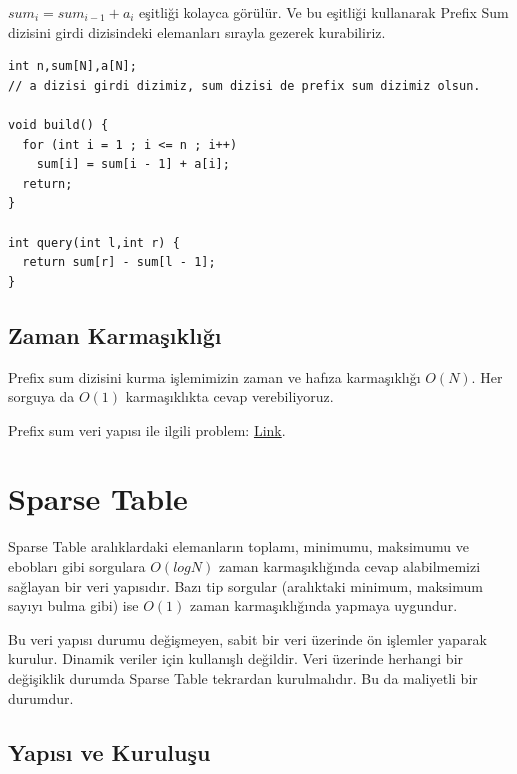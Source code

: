 \documentclass[12pt]{article}
\begin{document}
    $sum_i = sum_{i -1} + a_i$ e\c{s}itli\u{g}i kolayca g\"{o}r\"{u}l\"{u}r. Ve bu e\c{s}itli\u{g}i kullanarak Prefix Sum dizisini girdi dizisindeki elemanlar{\i} s{\i}rayla gezerek kurabiliriz.
	
    \begin{verbatim}
int n,sum[N],a[N];
// a dizisi girdi dizimiz, sum dizisi de prefix sum dizimiz olsun.

void build() {
  for (int i = 1 ; i <= n ; i++)
    sum[i] = sum[i - 1] + a[i];
  return;
}

int query(int l,int r) {
  return sum[r] - sum[l - 1];
}
    \end{verbatim}

	\subsection{Zaman Karma\c{s}{\i}kl{\i}\u{g}{\i}}
	
    Prefix sum dizisini kurma i\c{s}lemimizin zaman ve haf{\i}za karma\c{s}{\i}kl{\i}\u{g}{\i} $O(N)$. Her sorguya da $O(1)$ karma\c{s}{\i}kl{\i}kta cevap verebiliyoruz. 

    Prefix sum veri yap{\i}s{\i} ile ilgili problem: \href{https://uva.onlinejudge.org/index.php?option=com_onlinejudge&Itemid=8&category=24&page=show_problem&problem=1474}{Link}.
    \cleardoublepage

	\section{Sparse Table}

    Sparse Table aral{\i}klardaki elemanlar{\i}n toplam{\i}, minimumu, maksimumu ve eboblar{\i} gibi sorgulara $O(logN)$ zaman karma\c{s}{\i}kl{\i}\u{g}{\i}nda cevap alabilmemizi sa\u{g}layan bir veri yap{\i}s{\i}d{\i}r. Baz{\i} tip sorgular (aral{\i}ktaki minimum, maksimum say{\i}y{\i} bulma gibi) ise $O(1)$ zaman karma\c{s}{\i}kl{\i}\u{g}{\i}nda yapmaya uygundur.
    
    Bu veri yap{\i}s{\i} durumu de\u{g}i\c{s}meyen, sabit bir veri \"{u}zerinde \"{o}n i\c{s}lemler yaparak kurulur. Dinamik veriler i\c{c}in kullan{\i}\c{s}l{\i} de\u{g}ildir. Veri \"{u}zerinde herhangi bir de\u{g}i\c{s}iklik durumda Sparse Table tekrardan kurulmal{\i}d{\i}r. Bu da maliyetli bir durumdur.
    
    \subsection{Yap{\i}s{\i} ve Kurulu\c{s}u}
    
\end{document}
